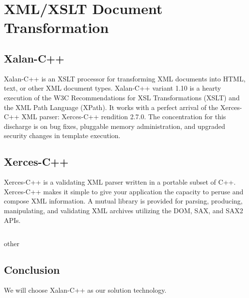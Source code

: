 \section{XML/XSLT Document Transformation}

\subsection{Xalan-C++}
Xalan-C++ is an XSLT processor for transforming XML documents into HTML, text, or other XML document types. Xalan-C++ variant 1.10 is a hearty execution of the W3C Recommendations for XSL Transformations (XSLT) and the XML Path Language (XPath). It works with a perfect arrival of the Xerces-C++ XML parser: Xerces-C++ rendition 2.7.0. The concentration for this discharge is on bug fixes, pluggable memory administration, and upgraded security changes in template execution.   
\subsection{Xerces-C++}
Xerces-C++ is a validating XML parser written in a portable subset of C++. Xerces-C++ makes it simple to give your application the capacity to peruse and compose XML information. A mutual library is provided for  parsing, producing, manipulating, and validating XML archives utilizing the DOM, SAX, and SAX2 APIs.

\subsection{}
other

\subsection{Conclusion}
We will choose Xalan-C++ as our solution technology.


